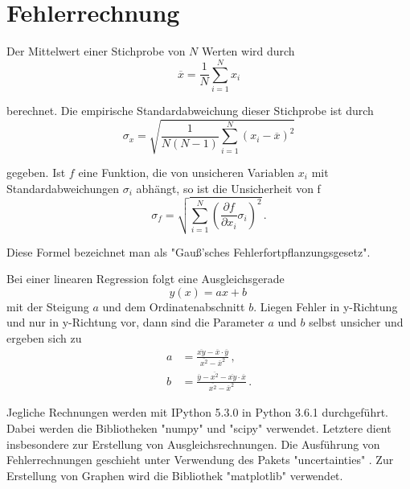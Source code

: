 \section{Fehlerrechnung}
\label{sec:Fehlerrechnung}
Der Mittelwert einer Stichprobe von $N$ Werten wird durch
\begin{equation}
  \overline{x} = \frac{1}{N} \sum\limits_{i = 1}^N x_i
  \label{eqn:mean}
\end{equation}

berechnet.
Die empirische Standardabweichung dieser Stichprobe ist durch
\begin{equation}
  \sigma_x = \sqrt{\frac{1}{N(N-1)}
    \sum\limits_{i = 1}^N
    (x_i-\overline{x})^2}
    \label{eqn:std}
\end{equation}

gegeben.
Ist $f$ eine Funktion, die von unsicheren Variablen $x_i$ mit
Standardabweichungen $\sigma_i$ abhängt, so ist die Unsicherheit von f
\begin{equation}
  \sigma_f = \sqrt{
    \sum\limits_{i = 1}^N
      \left( \frac{\partial f}{\partial x_i} \sigma_i \right)^{\!\! 2}
  }\,.
  \label{eqn:gaussfehler}
\end{equation}

Diese Formel bezeichnet man als "Gauß'sches Fehlerfortpflanzungsgesetz".

Bei einer linearen Regression folgt eine Ausgleichsgerade
\begin{equation}
  y(x) = ax+b\,
  \label{eqn:ausgleichsgerade}
\end{equation}
mit der Steigung $a$ und dem Ordinatenabschnitt $b$. Liegen Fehler in y-Richtung
und nur in y-Richtung vor, dann sind die Parameter $a$ und $b$ selbst unsicher
und ergeben sich zu
\begin{align}
  a &= \frac{\overline{xy}-\overline{x} \cdot \overline{y}}{\overline{x^2}-\overline{x}^2}\,,\\
  b &= \frac{\overline{y}-\overline{x^2}-\overline{xy} \cdot \overline{x}}{\overline{x^2}-\overline{x}^2}\,.
\end{align}

Jegliche Rechnungen werden mit IPython 5.3.0 in Python 3.6.1 durchgeführt. Dabei
werden die Bibliotheken "numpy" \cite{numpy} und "scipy" \cite{scipy} verwendet.
Letztere dient insbesondere zur Erstellung von Ausgleichsrechnungen.
Die Ausführung von Fehlerrechnungen geschieht unter Verwendung des Pakets
"uncertainties" \cite{uncertainties}. Zur Erstellung von Graphen wird die Bibliothek
"matplotlib" \cite{matplotlib} verwendet.
